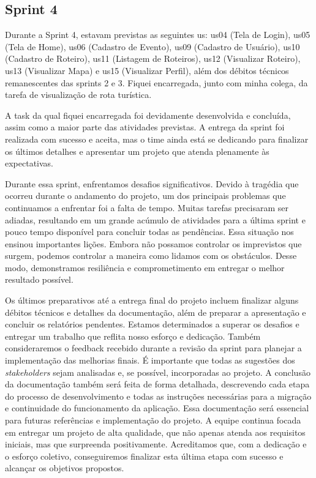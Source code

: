 \subsection{Sprint 4}
Durante a Sprint 4, estavam previstas as seguintes \ac{us}: \ac{us}04 (Tela de Login), \ac{us}05 (Tela de Home), \ac{us}06 (Cadastro de Evento), \ac{us}09 (Cadastro de Usuário), \ac{us}10 (Cadastro de Roteiro), \ac{us}11 (Listagem de Roteiros), \ac{us}12 (Visualizar Roteiro), \ac{us}13 (Visualizar Mapa) e \ac{us}15 (Visualizar Perfil), além dos débitos técnicos remanescentes das sprints 2 e 3. Fiquei encarregada, junto com minha colega, da tarefa de visualização de rota turística.

A task da qual fiquei encarregada foi devidamente desenvolvida e concluída, assim como a maior parte das atividades previstas. A entrega da sprint foi realizada com sucesso e aceita, mas o time ainda está se dedicando para finalizar os últimos detalhes e apresentar um projeto que atenda plenamente às expectativas.

Durante essa sprint, enfrentamos desafios significativos. Devido à tragédia que ocorreu durante o andamento do projeto, um dos principais problemas que continuamos a enfrentar foi a falta de tempo. Muitas tarefas precisaram ser adiadas, resultando em um grande acúmulo de atividades para a última sprint e pouco tempo disponível para concluir todas as pendências. Essa situação nos ensinou importantes lições. Embora não possamos controlar os imprevistos que surgem, podemos controlar a maneira como lidamos com os obstáculos. Desse modo, demonstramos resiliência e comprometimento em entregar o melhor resultado possível.

Os últimos preparativos até a entrega final do projeto incluem finalizar alguns débitos técnicos e detalhes da documentação, além de preparar a apresentação e concluir os relatórios pendentes. Estamos determinados a superar os desafios e entregar um trabalho que reflita nosso esforço e dedicação. Também consideraremos o feedback recebido durante a revisão da sprint para planejar a implementação das melhorias finais. É importante que todas as sugestões dos \textit{stakeholders} sejam analisadas e, se possível, incorporadas ao projeto. A conclusão da documentação também será feita de forma detalhada, descrevendo cada etapa do processo de desenvolvimento e todas as instruções necessárias para a migração e continuidade do funcionamento da aplicação. Essa documentação será essencial para futuras referências e implementação do projeto. A equipe continua focada em entregar um projeto de alta qualidade, que não apenas atenda aos requisitos iniciais, mas que surpreenda positivamente. Acreditamos que, com a dedicação e o esforço coletivo, conseguiremos finalizar esta última etapa com sucesso e alcançar os objetivos propostos.